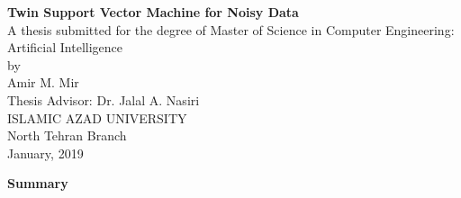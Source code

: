 \documentclass[a4paper, 12pt]{article}
\begin{document}
	
\begin{center}
	{\Large \textbf{Twin Support Vector Machine for Noisy Data}} \\[0.5cm]
	
	A thesis submitted for the degree of Master of Science in Computer Engineering: Artificial Intelligence \\[0.25cm]
	
	by \\[0.25cm]
	{\large Amir M. Mir} \\ [0.5cm]
	
	Thesis Advisor: {Dr. Jalal A. Nasiri} \\[0.25cm]
	
	ISLAMIC AZAD UNIVERSITY \\
	North Tehran Branch \\[0.25cm]
	
	January, 2019
	
\end{center}

\large\textbf{Summary}
\end{document}
